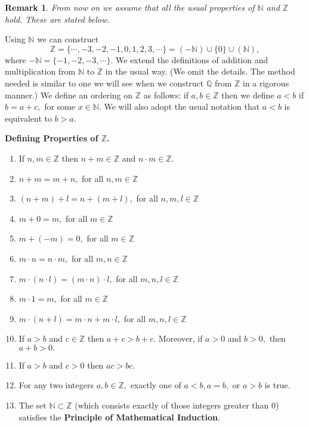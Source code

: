 \documentclass[11pt]{article}
\newcommand{\bbN}{\mathbb{N}}
\newcommand{\bbQ}{\mathbb{Q}}
\newcommand{\bbZ}{\mathbb{Z}}
\newtheorem*{remark}{Remark}
\begin{document}
\begin{remark}
From now on we assume that all the usual properties of $\bbN$ and $\bbZ$ hold. These are stated below. 
\end{remark}



Using $\bbN$ we can construct 
$$\bbZ=\{\cdots,-3,-2,-1,0,1,2,3,\cdots\}= (-\bbN)\cup\{0\}\cup(\bbN),$$
 where $-\bbN=\{-1,-2,-3,\cdots\}.$   We extend the definitions of addition and multiplication from $\bbN$ to $\bbZ$ in the usual way. 
 (We omit the details. The method needed is similar to one we will
 see when we construct $\bbQ$ from $\bbZ$ in a
 rigorous manner.)
 We define an ordering on $\bbZ$ as follows:  if  $a,b\in\bbZ$ then we define $a<b$ if $b=a+c,$ for some $x\in\bbN.$ 
 We will also adopt the usual notation that $a<b$ is equivalent to $b>a.$ \newpage


 {\bf Defining Properties of $\bbZ$.}

  
  \begin{enumerate}
  \item If $n,m\in\bbZ$ then $n+m\in\bbZ$ and $n\cdot m\in\bbZ.$  \qquad
  \item $n+m=m+n,$ for all $n,m\in \bbZ$
  \item $(n+m)+l=n+(m+l),$ for all $n,m,l\in\bbZ$ 
  \item$m+0=m,$ for all $m\in\bbZ$
  \item $m+(-m)=0,$ for all $m\in \bbZ$
  \item $m\cdot n=n\cdot m,$ for all $m,n\in\bbZ$
  \item $m\cdot(n\cdot l)=(m\cdot n)\cdot l,$ for all $m,n,l\in\bbZ$ 
  \item$m\cdot 1=m,$ for all $m\in\bbZ$
  \item$m\cdot (n+l)=m\cdot n+m\cdot l,$ for all $m,n,l\in\bbZ$  
  \item If $a>b$ and $c\in\bbZ$ then $a+c>b+c$. Moreover, if $a>0$ and $b>0,$ then $a+b>0.$
  \item If $a>b$ and $c>0$ then $ac>bc$.
  \item For any two integers $a,b\in\bbZ,$ exactly one of $a<b,a=b,$ or $a>b$ is true. 
  \item The set $\bbN\subset\bbZ$ (which consists exactly of those integers greater than $0$)
 satisfies the {\bf Principle of Mathematical Induction}.
 \end{enumerate}   
\end{document}

